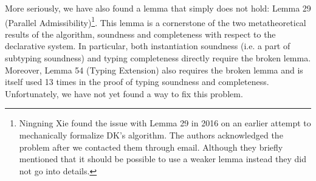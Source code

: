 
More seriously, we have also found a lemma that simply does not hold:
Lemma 29 (Parallel Admissibility)\footnote{Ningning Xie found the issue with Lemma 29 in 2016 on an earlier attempt to mechanically
  formalize DK's algorithm. The authors acknowledged the problem after we contacted them through email.
  Although they briefly mentioned that it should be possible to use a weaker lemma instead they did
  not go into details.}.
This lemma is a cornerstone of the two metatheoretical results 
of the algorithm, soundness and completeness with respect to the declarative system.
In particular, both instantiation soundness (i.e. a part of subtyping
soundness) and typing completeness directly require the broken lemma.
Moreover, Lemma 54 (Typing Extension) also requires the broken lemma and is
itself used 13 times in the proof of typing soundness and completeness.
Unfortunately, we have not yet found a way to fix this problem.

